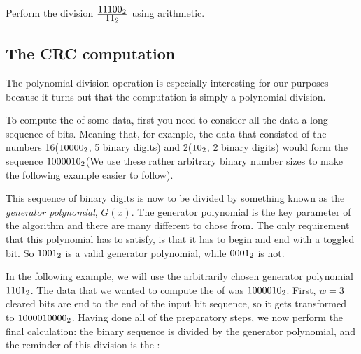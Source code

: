\begin{Exercise}[label={poly-div}]
  Perform the division $\frac{\mbox{\ensuremath{11100_2}}}{\mbox{\ensuremath{11_2}}}$ using \crc arithmetic.
\end{Exercise}

\subsection{The CRC computation}

The polynomial division operation is especially interesting for our
purposes because it turns out that the \crc computation is simply a
polynomial division.

To compute the \crc of some data, first you need to consider all the
data a long sequence of bits. Meaning that, for example, the data that
consisted of the numbers 16($\mbox{\ensuremath{10000_2}}$, 5 binary digits) and 2($\mbox{\ensuremath{10_2}}$, 2
binary digits) would form the sequence $\mbox{\ensuremath{1000010_2}}$(We use these rather
arbitrary binary number sizes to make the following example easier to
follow).

This sequence of binary digits is now to be divided by something known
as the \textit{generator polynomial}, $G(x)$. The generator polynomial
is the key parameter of the algorithm and there are many different to
chose from. The only requirement that this polynomial has to satisfy,
is that it has to begin and end with a toggled bit. So $\mbox{\ensuremath{1001_2}}$ is a valid
generator polynomial, while $\mbox{\ensuremath{0001_2}}$ is not.

In the following example, we will use the arbitrarily chosen generator
polynomial $\mbox{\ensuremath{1101_2}}$. The data that we wanted to compute the \crc of was
$\mbox{\ensuremath{1000010_2}}$.  First, $w=3$ cleared bits are end to the end of the
input bit sequence, so it gets transformed to
$\mbox{\ensuremath{1000010000_2}}$. Having done all of the preparatory steps, we now
perform the final calculation: the binary sequence is divided by the
generator polynomial, and the reminder of this division is the \crc:


